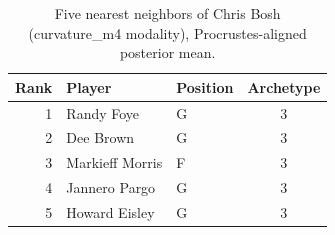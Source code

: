 \begin{table}[htbp]
  \centering\small
  \begin{tabular}{rllc}
    \toprule
    Rank & Player & Position & Archetype \\
    \midrule
    1 & Randy Foye & G & 3 \\
    2 & Dee Brown & G & 3 \\
    3 & Markieff Morris & F & 3 \\
    4 & Jannero Pargo & G & 3 \\
    5 & Howard Eisley & G & 3 \\
    \bottomrule
  \end{tabular}
  \caption{Five nearest neighbors of Chris Bosh (curvature_m4 modality), Procrustes-aligned posterior mean.}
  \label{tab:Chris_Bosh_neighbors_curvature_m4}
\end{table}

